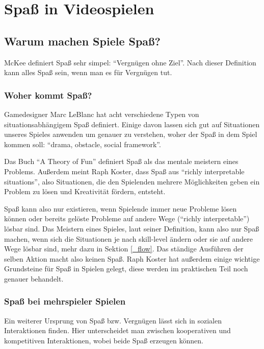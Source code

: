 \chapter{Spaß in Videospielen}

\section{Warum machen Spiele Spaß?}

McKee definiert Spaß sehr simpel: "`Vergnügen ohne Ziel"'. Nach dieser Definition kann alles Spaß sein, wenn man es für Vergnügen tut\cite{_fun}.

\subsection{Woher kommt Spaß?}

Gamedesigner Marc LeBlanc hat acht verschiedene Typen von situationsabhängigem Spaß definiert. Einige davon lassen sich gut auf Situationen unseres Spieles anwenden um genauer zu verstehen, woher der Spaß in dem Spiel kommen soll: "`drama, obstacle, social framework"'. 

Das Buch "`A Theory of Fun"'\cite{_theory_of_fun} definiert Spaß als das mentale meistern eines Problems\cite[S. 71]{_theory_of_fun}. Außerdem meint Raph Koster, dass Spaß aus "`richly interpretable situations"'\cite[S. 40]{_theory_of_fun}, also Situationen, die den Spielenden mehrere Möglichkeiten geben ein Problem zu lösen und Kreativität fördern, entsteht. 

Spaß kann also nur existieren, wenn Spielende immer neue Probleme lösen können oder bereits gelöste Probleme auf andere Wege ("`richly interpretable"') lösbar sind. Das Meistern eines Spieles, laut seiner Definition, kann also nur Spaß machen, wenn sich die Situationen je nach skill-level ändern oder sie auf andere Wege lösbar sind, mehr dazu in Sektion \ref{_flow}. Das ständige Ausführen der selben Aktion macht also keinen Spaß. Raph Koster hat außerdem einige wichtige Grundsteine für Spaß in Spielen gelegt, diese werden im praktischen Teil noch genauer behandelt.

\subsection{Spaß bei mehrspieler Spielen}

Ein weiterer Ursprung von Spaß bzw. Vergnügen lässt sich in sozialen Interaktionen finden\cite[S. 72]{_theory_of_fun}. Hier unterscheidet man zwischen kooperativen und kompetitiven Interaktionen, wobei beide Spaß erzeugen können. 

